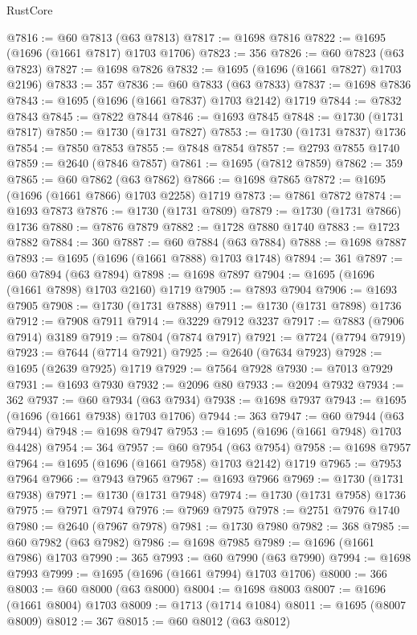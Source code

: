 \begin{lexlean}{RustCore}
\begin{coremodule}
@7816 := @60 @7813 (@63 @7813)
@7817 := @1698 @7816
@7822 := @1695 (@1696 (@1661 @7817) @1703 @1706)
@7823 := 356
@7826 := @60 @7823 (@63 @7823)
@7827 := @1698 @7826
@7832 := @1695 (@1696 (@1661 @7827) @1703 @2196)
@7833 := 357
@7836 := @60 @7833 (@63 @7833)
@7837 := @1698 @7836
@7843 := @1695 (@1696 (@1661 @7837) @1703 @2142) @1719
@7844 := @7832 @7843
@7845 := @7822 @7844
@7846 := @1693 @7845
@7848 := @1730 (@1731 @7817)
@7850 := @1730 (@1731 @7827)
@7853 := @1730 (@1731 @7837) @1736
@7854 := @7850 @7853
@7855 := @7848 @7854
@7857 := @2793 @7855 @1740
@7859 := @2640 (@7846 @7857)
@7861 := @1695 (@7812 @7859)
@7862 := 359
@7865 := @60 @7862 (@63 @7862)
@7866 := @1698 @7865
@7872 := @1695 (@1696 (@1661 @7866) @1703 @2258) @1719
@7873 := @7861 @7872
@7874 := @1693 @7873
@7876 := @1730 (@1731 @7809)
@7879 := @1730 (@1731 @7866) @1736
@7880 := @7876 @7879
@7882 := @1728 @7880 @1740
@7883 := @1723 @7882
@7884 := 360
@7887 := @60 @7884 (@63 @7884)
@7888 := @1698 @7887
@7893 := @1695 (@1696 (@1661 @7888) @1703 @1748)
@7894 := 361
@7897 := @60 @7894 (@63 @7894)
@7898 := @1698 @7897
@7904 := @1695 (@1696 (@1661 @7898) @1703 @2160) @1719
@7905 := @7893 @7904
@7906 := @1693 @7905
@7908 := @1730 (@1731 @7888)
@7911 := @1730 (@1731 @7898) @1736
@7912 := @7908 @7911
@7914 := @3229 @7912 @3237
@7917 := @7883 (@7906 @7914) @3189
@7919 := @7804 (@7874 @7917)
@7921 := @7724 (@7794 @7919)
@7923 := @7644 (@7714 @7921)
@7925 := @2640 (@7634 @7923)
@7928 := @1695 (@2639 @7925) @1719
@7929 := @7564 @7928
@7930 := @7013 @7929
@7931 := @1693 @7930
@7932 := @2096 @80
@7933 := @2094 @7932
@7934 := 362
@7937 := @60 @7934 (@63 @7934)
@7938 := @1698 @7937
@7943 := @1695 (@1696 (@1661 @7938) @1703 @1706)
@7944 := 363
@7947 := @60 @7944 (@63 @7944)
@7948 := @1698 @7947
@7953 := @1695 (@1696 (@1661 @7948) @1703 @4428)
@7954 := 364
@7957 := @60 @7954 (@63 @7954)
@7958 := @1698 @7957
@7964 := @1695 (@1696 (@1661 @7958) @1703 @2142) @1719
@7965 := @7953 @7964
@7966 := @7943 @7965
@7967 := @1693 @7966
@7969 := @1730 (@1731 @7938)
@7971 := @1730 (@1731 @7948)
@7974 := @1730 (@1731 @7958) @1736
@7975 := @7971 @7974
@7976 := @7969 @7975
@7978 := @2751 @7976 @1740
@7980 := @2640 (@7967 @7978)
@7981 := @1730 @7980
@7982 := 368
@7985 := @60 @7982 (@63 @7982)
@7986 := @1698 @7985
@7989 := @1696 (@1661 @7986) @1703
@7990 := 365
@7993 := @60 @7990 (@63 @7990)
@7994 := @1698 @7993
@7999 := @1695 (@1696 (@1661 @7994) @1703 @1706)
@8000 := 366
@8003 := @60 @8000 (@63 @8000)
@8004 := @1698 @8003
@8007 := @1696 (@1661 @8004) @1703
@8009 := @1713 (@1714 @1084)
@8011 := @1695 (@8007 @8009)
@8012 := 367
@8015 := @60 @8012 (@63 @8012)

\end{coremodule}
\end{lexlean}
